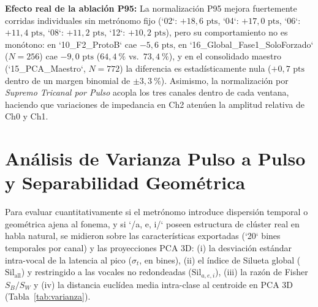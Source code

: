 \documentclass[11pt,a4paper]{article}
\begin{document}
\textbf{Efecto real de la ablaci\'on P95:} La normalizaci\'on P95 mejora fuertemente corridas individuales sin metr\'onomo fijo (`02`: $+18{,}6\text{ pts}$, `04`: $+17{,}0\text{ pts}$, `06`: $+11{,}4\text{ pts}$, `08`: $+11{,}2\text{ pts}$, `12`: $+10{,}2\text{ pts}$), pero su comportamiento no es mon\'otono: en `10\_F2\_ProtoB` cae $-5{,}6\text{ pts}$, en `16\_Global\_Fase1\_SoloForzado` ($N=256$) cae $-9{,}0\text{ pts}$ ($64{,}4\ \%$ vs.\ $73{,}4\ \%$), y en el consolidado maestro (`15\_PCA\_Maestro`, $N=772$) la diferencia es estad\'isticamente nula ($+0{,}7\text{ pts}$ dentro de un margen binomial de $\pm 3{,}3\ \%$). Asimismo, la normalizaci\'on por \textit{Supremo Tricanal por Pulso} acopla los tres canales dentro de cada ventana, haciendo que variaciones de impedancia en Ch2 aten\'uen la amplitud relativa de Ch0 y Ch1.

\section{An\'alisis de Varianza Pulso a Pulso y Separabilidad Geom\'etrica}

Para evaluar cuantitativamente si el metr\'onomo introduce dispersi\'on temporal o geom\'etrica ajena al fonema, y si `/a, e, i/` poseen estructura de cl\'uster real en habla natural, se midieron sobre las caracter\'isticas exportadas (`20` bines temporales por canal) y las proyecciones PCA 3D: (i) la desviaci\'on est\'andar intra-vocal de la latencia al pico ($\sigma_t$, en bines), (ii) el \'indice de Silueta global ($\text{Sil}_{\text{all}}$) y restringido a las vocales no redondeadas ($\text{Sil}_{a,e,i}$), (iii) la raz\'on de Fisher $S_B / S_W$ y (iv) la distancia eucl\'idea media intra-clase al centroide en PCA 3D (Tabla~\ref{tab:varianza}).
\end{document}
